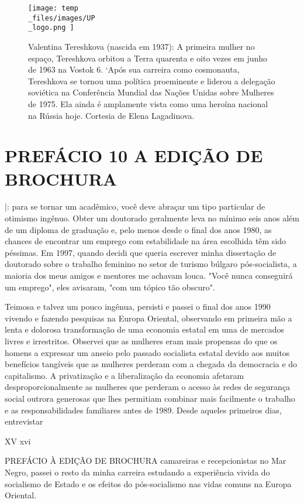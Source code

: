 \begin{figure}
	\centering
	\texttt{[image: temp\\\_files/images/UP\\\_logo.png ]}
	\caption{Valentina Tereshkova (nascida em 1937): A primeira mulher no espaço, Tereshkova orbitou a Terra quarenta e oito vezes em junho de 1963 na Vostok {\color{blue}6}. ‘Após sua carreira como cosmonauta, Tereshkova se tornou uma política proeminente e liderou a delegação soviética na Conferência Mundial das Nações Unidas sobre Mulheres de 1975. Ela ainda é amplamente vista como uma heroína nacional na Rússia hoje. Cortesia de Elena Lagadinova.}
	\label{ }
\end{figure}
 \par 
\chapter{PREFÁCIO 10 A EDIÇÃO DE BROCHURA}\label{PREFÁCIO 10 A EDIÇÃO DE BROCHURA}
 \par 
|: para se tornar um acadêmico, você deve abraçar um tipo particular de otimismo ingênuo. Obter um doutorado geralmente leva no mínimo seis anos além de um diploma de graduação e, pelo menos desde o final dos anos 1980, as chances de encontrar um emprego com estabilidade na área escolhida têm sido péssimas. Em 1997, quando decidi que queria escrever minha dissertação de doutorado sobre o trabalho feminino no setor de turismo búlgaro pós-socialista, a maioria dos meus amigos e mentores me achavam louca. "Você nunca conseguirá um emprego", eles avisaram, "com um tópico tão obscuro".
 \par 
Teimosa e talvez um pouco ingênua, persisti e passei o final dos anos 1990 vivendo e fazendo pesquisas na Europa Oriental, observando em primeira mão a lenta e dolorosa transformação de uma economia estatal em uma de mercados livres e irrestritos. Observei que as mulheres eram mais propensas do que os homens a expressar um anseio pelo passado socialista estatal devido aos muitos benefícios tangíveis que as mulheres perderam com a chegada da democracia e do capitalismo. A privatização e a liberalização da economia afetaram desproporcionalmente as mulheres que perderam o acesso às redes de segurança social outrora generosas que lhes permitiam combinar mais facilmente o trabalho e as responsabilidades familiares antes de 1989. Desde aqueles primeiros dias, entrevistar
 \par 
XV xvi
 \par 
PREFÁCIO À EDIÇÃO DE BROCHURA camareiras e recepcionistas no Mar Negro, passei o resto da minha carreira estudando a experiência vivida do socialismo de Estado e os efeitos do pós-socialismo nas vidas comuns na Europa Oriental.
